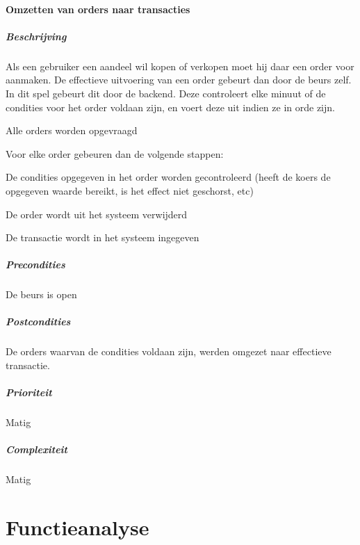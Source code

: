 \subsubsection{Omzetten van orders naar transacties}
\begin{compact}
\paragraph{Beschrijving} Als een gebruiker een aandeel wil kopen of verkopen moet hij daar een order voor aanmaken. De effectieve uitvoering van een order gebeurt dan door de beurs zelf. In dit spel gebeurt dit door de backend. Deze controleert elke minuut of de condities voor het order voldaan zijn, en voert deze uit indien ze in orde zijn.
\begin{itemize_compact}
	\item Alle orders worden opgevraagd
  \item Voor elke order gebeuren dan de volgende stappen:
	\begin{itemize_compact}
		\item De condities opgegeven in het order worden gecontroleerd (heeft de koers de opgegeven waarde bereikt, is het effect niet geschorst, etc)
		\item De order wordt uit het systeem verwijderd
		\item De transactie wordt in het systeem ingegeven
	\end{itemize_compact}
\end{itemize_compact}
\paragraph{Precondities} De beurs is open 
\paragraph{Postcondities} De orders waarvan de condities voldaan zijn, werden omgezet naar effectieve transactie.
\paragraph{Prioriteit}Matig
\paragraph{Complexiteit}Matig
\end{compact}


%
%

\chapter{Functieanalyse}

